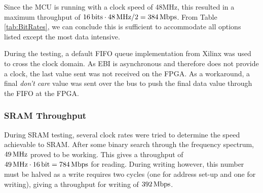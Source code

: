 Since the MCU is running with a clock speed of 48MHz, this resulted in a maximum throughput of $\unit[16]{bits} \cdot \unit[48]{MHz} / 2 = \unit[384]{Mbps}$.
From Table \ref{tab:BitRates}, we can conclude this is sufficient to accommodate all options listed except the most data intensive.

During the testing, a default FIFO queue implementation from Xilinx was used to cross the clock domain.
As EBI is asynchronous and therefore does not provide a clock, the last value sent was not received on the FPGA.
As a workaround, a final \textit{don't care} value was sent over the bus to push the final data value through the FIFO at the FPGA.

\subsubsection{SRAM Throughput} \label{subsec:SramThroughput}
During SRAM testing, several clock rates were tried to determine the speed achievable to SRAM.
After some binary search through the frequency spectrum, $\unit[49]{MHz}$ proved to be working.
This gives a throughput of $\unit[49]{MHz}\cdot\unit[16]{bit} = \unit[784]{Mbps}$ for reading.
During writing however, this number must be halved as a write requires two cycles (one for address set-up and one for writing), giving a throughput for writing of $\unit[392]{Mbps}$.
